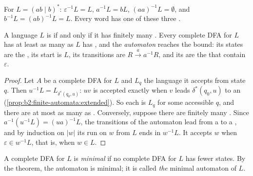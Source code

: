 For $L = (ab \mid b)^*$: $\varepsilon^{-1}L = L$, $a^{-1}L = bL$, $(aa)^{-1}L = \emptyset$, and $b^{-1}L = (ab)^{-1}L =
L$. Every word has one of these three .

\begin{theorem}\label{thm:b2:regular-languages:myhill-nerode}
A language $L$ is  if and only if it has finitely many . Every complete DFA for $L$ has at least as
many  as $L$ has , and the \emph{ automaton} reaches the bound: its states are the
, its start is $L$, its transitions are $R \xrightarrow{a} a^{-1}R$, and its  are the
 that contain $\varepsilon$.
\end{theorem}

\begin{proof}
Let $A$ be a complete DFA for $L$ and $L_q$ the language it accepts from state $q$. Then $u^{-1}L = L_{\delta^*(q_0,
u)}$: $uv$ is accepted exactly when $v$ leads $\delta^*(q_0, u)$ to an 
(\cref{prop:b2:finite-automata:extended}). So each  is $L_q$ for some accessible $q$, and there are at most as
many  as . Conversely, suppose there are finitely many . Since $a^{-1}(u^{-1}L) =
(ua)^{-1}L$, the transitions of the  automaton lead from a  to a , and by induction on $|w|$ its
run on $w$ from $L$ ends in $w^{-1}L$. It accepts $w$ when $\varepsilon \in w^{-1}L$, that is, when $w \in L$.
\end{proof}

\begin{definition}\label{def:b2:regular-languages:minimal}
A complete DFA for $L$ is \emph{minimal} if no complete DFA for $L$ has fewer states. By the
theorem, the  automaton is minimal; it is called \emph{the} minimal automaton of $L$.
\end{definition}

